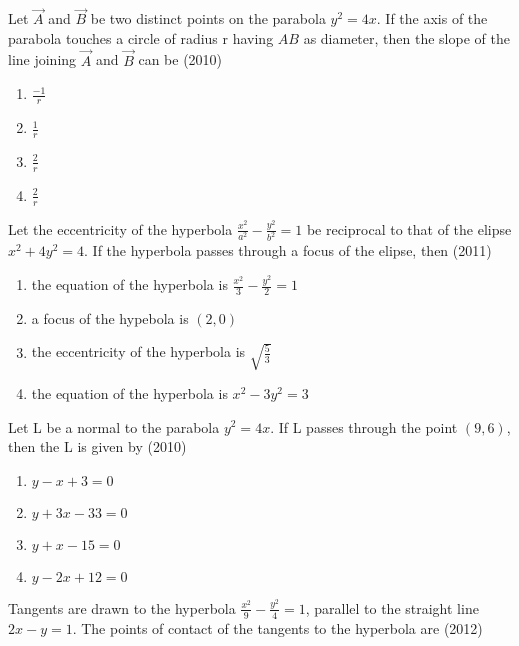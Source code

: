 \iffalse
  \title{ASSIGNMENT-1}
  \author{EE24BTECH11032- JOHN BOBBY}
  \section{mcq-multiple}
\fi


	\item Let $\vec{A}$ and $\vec{B}$ be two distinct points on the parabola $y^2=4x$. If
      	      the axis of the parabola touches a circle of radius r having
		$AB$ as diameter, then the slope of the line joining $\vec{A}$ and $\vec{B}$
	     can be 
		\hfill(2010)
		
		 \begin{enumerate}
			\item$\frac{-1}{r}$
			\item$\frac{1}{r}$
			\item$\frac{2}{r}$
			\item$\frac{2}{r}$
	        \end{enumerate}
	\item Let the eccentricity of the hyperbola $\frac{x^2}{a^2}-\frac{y^2}{b^2}=1$ be reciprocal to that of the elipse $x^2+4y^2=4$. If the hyperbola
	passes through a focus of the elipse, then 
		\hfill(2011)
		
		 \begin{enumerate}
			\item the equation of the hyperbola is $\frac{x^2}{3}-\frac{y^2}{2}=1$
			\item a focus of the hypebola is $(2,0)$
			\item the eccentricity of the hyperbola is $\sqrt{\frac{5}{3}}$
			\item the equation of the hyperbola is $x^2-3y^2=3$
		 \end{enumerate}
	\item Let L be a normal to the parabola $y^2=4x$. If L passes through the point $(9,6)$, then the L is given by 
		\hfill(2010)
		
		 \begin{enumerate}
			\item $y-x+3=0$
			\item $y+3x-33=0$
			\item $y+x-15=0$
			\item $y-2x+12=0$
		 \end{enumerate}
	\item Tangents are drawn to the hyperbola $\frac{x^2}{9}-\frac{y^2}{4}=1$, parallel to the straight line $2x-y=1$. The points of contact of the tangents to the hyperbola
		are  
		\hfill(2012)
		
